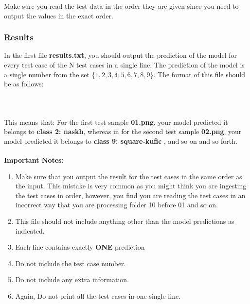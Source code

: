 \documentclass[12pt]{article}
\begin{document}
Make sure you read the test data in the order they are given since you need to output the values in the exact order.

\subsubsection{Results}
In the first file \textbf{results.txt}, you should output the prediction of the model for every test case of the N test cases in a single line. The prediction of the model is a single number from the set $\{1,2,3,4,5,6,7,8,9\}$.
\newpage
The format of this file should be as follows:\\\\
\noindent{}
\\\\
This means that: For the first test sample \textbf{01.png}, your model predicted it belongs to \textbf{class 2: naskh}, whereas in for the second test sample \textbf{02.png}, your model predicted it belongs to \textbf{class 9: square-kufic }, and so on and so forth.
\\\\
\textbf{Important Notes:}
\begin{enumerate}
    \item Make sure that you output the result for the test cases in the same order as the input. This mistake is very common as you might think you are ingesting the test cases in order, however, you find you are reading the test cases in an incorrect way that you are processing folder 10 before 01 and so on.
    \item This file should not include anything other than the model predictions as indicated.
    \item Each line contains exactly \textbf{ONE} prediction
    \item Do not include the test case number.
    \item Do not include any extra information.
    \item Again, Do not print all the test cases in one single line.
\end{enumerate}
\end{document}
